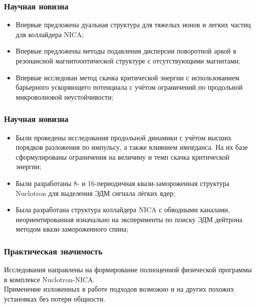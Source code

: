 \begin{frame}
	\frametitle{Научная новизна}
	\begin{itemize}
		\item	Впервые предложена дуальная структура для тяжелых ионов и легких частиц для коллайдера NICA;
		\vspace{1em}
		\item 	Впервые предложены методы подавления дисперсии поворотной аркой в резонансной магнитооптической структуре с отсутствующими магнитами;
		\vspace{1em}
		\item	Впервые исследован метод скачка критической энергии с использованием барьерного ускоряющего потенциала с учётом ограничений по продольной микроволновой неустойчивости;
	\end{itemize}
	
\end{frame}
\begin{frame}
	\frametitle{Научная новизна}
	\begin{itemize}
		\item 	Были проведены исследования продольной динамики с учётом высших порядков разложения по импульсу, а также влиянием импеданса. На их базе сформулированы ограничения на величину и темп скачка критической энергии;
		\vspace{1em}
		\item	Были разработаны 8- и 16-периодичная квази-замороженная структура Nuclotron для выделения ЭДМ сигнала лёгких ядер;
		\vspace{1em}
		\item	Была разработана структура коллайдера NICA с обводными каналами, неориентированная изначально на эксперименты по поиску ЭДМ дейтрона методом квази-замороженного спина;
	\end{itemize}
\end{frame}
\begin{frame}
	\frametitle{Практическая значимость}
	Исследования направлены на формирование полноценной физической программы в комплексе Nuclotron-NICA. \\
	Применение изложенных в работе подходов возможно и на других похожих установках без потери общности.
\end{frame}
